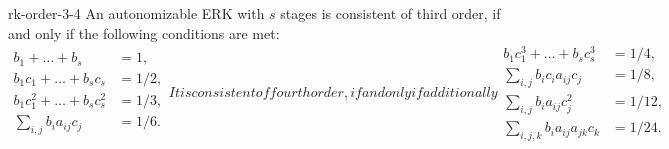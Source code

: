 \begin{Lemma}{rk-order-3-4}
  An autonomizable ERK with $s$ stages is consistent of third order, if
  and only if the following conditions are met:
  \begin{subequations}
    \label{eq:explicit:11}
    \begin{align}
      \label{eq:explicit:12}
      b_1 + \dots + b_s &= 1, \\
      \label{eq:explicit:13}
      b_1c_1 + \dots + b_s c_s &= 1/2, \\
      \label{eq:explicit:14}
      b_1c_1^2 + \dots + b_s c_s^2 &= 1/3, \\
      \label{eq:explicit:15}
      \sum\nolimits_{i,j} b_i a_{ij}c_j &= 1/6.
    \end{align}
    It is consistent of fourth order, if and only if additionally
    \begin{align}
    \label{eq:explicit:16}
    b_1c_1^3 + \dots + b_s c_s^3 &= 1/4, \\
    \label{eq:explicit:17}
    \sum\nolimits_{i,j} b_i c_i a_{ij} c_j &= 1/8, \\
    \label{eq:explicit:18}
    \sum\nolimits_{i,j} b_i a_{ij} c_j^2 &= 1/12, \\
    \label{eq:explicit:19}
    \sum\nolimits_{i,j,k} b_i a_{ij} a_{jk} c_k &= 1/24.
  \end{align}
  \end{subequations}
\end{Lemma}

